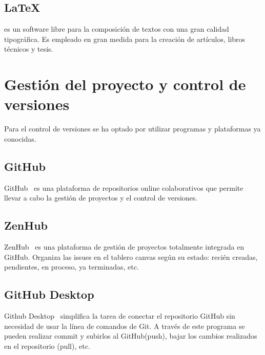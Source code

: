 \subsection{LaTeX} es un software libre para la composición de textos con una gran calidad tipográfica. Es empleado en gran medida para la creación de artículos, libros técnicos y tesis.

\section{Gestión del proyecto y control de versiones}
Para el control de versiones se ha optado por utilizar programas y plataformas ya conocidas.

\subsection{GitHub}
GitHub~\cite{pagina_github} es una plataforma de repositorios online colaborativos que permite llevar a cabo la gestión de proyectos y el control de versiones.

\subsection{ZenHub}
ZenHub~\cite{pagina_zenhub} es una plataforma de gestión de proyectos totalmente integrada en GitHub. Organiza las issues en el tablero canvas según su estado: recién creadas, pendientes, en proceso, ya terminadas, etc.

\subsection{GitHub Desktop}
Github Desktop~\cite{pagina_github_desktop} simplifica la tarea de conectar el repositorio GitHub sin necesidad de usar la línea de comandos de Git. A través de este programa se pueden realizar commit y subirlos al GitHub(push), bajar los cambios realizados en el repositorio (pull), etc. 